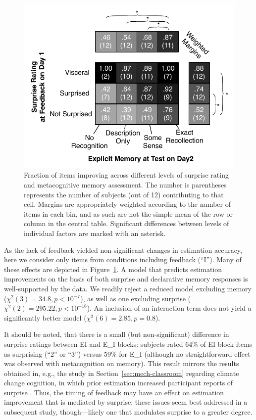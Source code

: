 \begin{figure}[h]
\centering
\includegraphics{shaded-table-reversals.pdf}
\caption{Fraction of items improving across different levels of surprise rating
and metacognitive memory assessment. The number is parentheses represents the
number of subjects (out of 12) contributing to that cell. Margins are
appropriately weighted according to the number of items in each bin, and as such
are not the simple mean of the row or column in the central table. Significant
differences between levels of individual factors are marked with an asterisk.}
\label{fig:ei-table} 
\end{figure}

As the lack of feedback yielded non-significant changes in estimation accuracy,
here we consider only items from conditions including feedback (``I''). Many of
these effects are depicted in Figure~\ref{fig:ei-table}. A model that predicts
estimation improvements on the basis of both surprise and declarative memory
responses is well-supported by the data. We readily reject a reduced model
excluding memory ($\chi^2(3) = 34.8, p < 10^{-7}$), as well as one excluding
surprise ($\chi^2(2) = 295.22, p < 10^{-16}$). An inclusion of an interaction
term does not yield a significantly better model ($\chi^2(6) = 2.85, p = 0.8$). 

It should be noted, that there is a small (but non-significant) difference in
surprise ratings between EI and E\_I blocks: subjects rated 64\% of EI block
items as surprising (``2'' or ``3'') versus 59\% for E\_I (although no
straightforward effect was observed with metacognition on memory).  This result
mirrors the results obtained in, e.g., the study in
Section~\ref{sec:mech-classroom} regarding climate change cognition, in which
prior estimation increased participant reports of surprise
\parencite[cf.][]{rinne_estimation_2006}.  Thus, the timing of feedback may have
an effect on estimation improvement that is mediated by surprise; these issues
seem best addressed in a subsequent study, though---likely one that modulates
surprise to a greater degree.  

